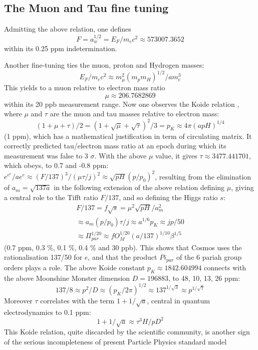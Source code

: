 \documentclass[twoside,draft]{article}
\begin{document}
\begin{sloppypar}
{\subsection {The Muon and Tau fine tuning}

Admitting the above relation, one defines 
\begin{equation} 
F = a_{w}^{1/2} = E_{F} /m_{e} c^{2} \approx 573007.3652
\end{equation}
within its 0.25 ppm indetermination. 

Another fine-tuning ties the muon, proton and Hydrogen masses: 
\begin{equation}
E_{F}/m_{e} c^{2} \approx
m_{\mu}^{2}(m_{p} m_{H})^{1/2}/am_{e}^{3}
\end{equation} 
This yields to a muon relative to electron mass ratio 
\begin{equation}
\mu \approx 206.7682869
\end{equation} within its 20 ppb measurement range.
Now one observes the Koide relation \cite{Atiyah1}, where $\mu$ and $\tau$ are the muon and tau masses relative to electron mass:
\begin{equation}
(1 + \mu + \tau)/2 = (1 + \sqrt\mu + \sqrt\tau)^2/3 = p_K \approx 4\pi (apH)^{1/4}
\end{equation}
(1 ppm), which has a mathematical justification in term of circulating matrix. It correctly predicted tau/electron
mass ratio at an epoch during which its measurement was false to 3 $\sigma$. With the above $\mu$ value, it
gives $\tau \approx 3477.441701$, which obeys, to 0.7 and -0.8 ppm: $e^{e^e}/a e^e \approx (F/137)^{3}/ (\mu\tau/j)^2 \approx  \sqrt{pH} (p/p_0)^2$, resulting from the elimination of $a_m = \sqrt{137a}$ in the following extension of the above relation defining $\mu$, giving a central role to the Tifft ratio $F/137$, and so defining the Higgs ratio $s$:
$$
\begin{array}{ll}
%
\displaystyle
F/137 = f \sqrt{s} = \mu^2 \sqrt{pH}/a_m^2 \\ \approx a_m (p/p_0) \tau /j \approx a^{1/6}p_K \approx jp/50 \\
\approx \Pi_{par}^{1/20}
\approx f O_M^{1/20}(a/137)^{1/10}\beta^{1/5} 
\end{array}
$$
(0.7 ppm, 0.3 \%, 0.1 \%, 0.4  \% and 30 ppb). This shows that Cosmos uses the rationalisation 137/50 for $e$, and that the product $Pi_{par}$ of the 6 pariah group orders plays a role. The above Koide constant $p_K \approx 1842.604994$ connects with the above Moonshine Monster dimension \cite{Conway} $D = 196883$, to 48, 10, 13, 26 ppm:
$$137/8 \approx p^2/D  \approx (p_K/2\pi)^{1/2} \approx 137^{1/\sqrt3} \approx p^{1/\sqrt7}$$ 
Moreover $\tau$ correlates with the
term $1+1/\sqrt{a}$, central in quantum electrodynamics to 0.1 ppm:
\begin{equation}
1+1/\sqrt{a} \approx \tau^{3} H/pD^{2}
\end{equation}
This Koide relation, quite discarded by the scientific community, is another sign of the serious incompleteness of present Particle Physics standard model

}
\end{sloppypar}
\end{document}

